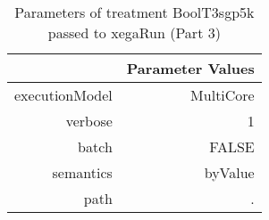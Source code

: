 \begin{table}[ht]
\centering
\begin{tabular}{rr}
  \hline
 & Parameter Values \\ 
  \hline
executionModel & MultiCore \\ 
  verbose & 1 \\ 
  batch & FALSE \\ 
  semantics & byValue \\ 
  path & . \\ 
   \hline
\end{tabular}
\caption{ Parameters of treatment BoolT3sgp5k passed to xegaRun
 (Part 3)} 
\end{table}
